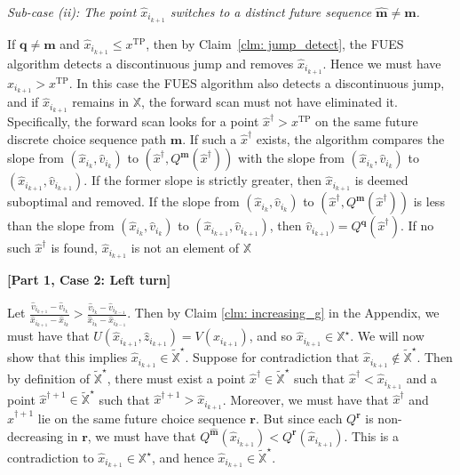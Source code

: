 \documentclass[12pt]{article}
\newcommand{\mVecVar}{\mathbf{m}}
\newcommand{\qVecVar}{\mathbf{q}}
\newcommand{\rVecVar}{\mathbf{r}}
\begin{document}
\textit{Sub-case (ii): The point $\hat{x}_{i_{k+1}}$ switches to a distinct future sequence $\hat{\mVecVar}\neq \mVecVar$.}

If $\qVecVar\neq \mVecVar$ and $\hat{x}_{i_{k+1}}\leq x^{\text{TP}}$, then by Claim~\ref{clm: jump_detect}, the FUES algorithm detects a discontinuous jump and removes $\hat{x}_{i_{k+1}}$.  Hence we must have $\hat{x}_{i_{k+1}} > x^{\text{TP}}$.  In this case the FUES algorithm also detects a discontinuous jump, and if $\hat{x}_{i_{k+1}}$ remains in $\mathbb{X}$, the forward scan must not have eliminated it.  Specifically, the forward scan looks for a point $\hat{x}^{\dagger} > x^{\text{TP}}$ on the same future discrete choice sequence path $\mVecVar$.  
If such a $\hat{x}^{\dagger}$ exists, the algorithm compares the slope from $(\hat{x}_{i_{k}},\hat{v}_{i_{k}})$ to $(\hat{x}^{\dagger},Q^{\mVecVar}(\hat{x}^{\dagger}))$ with the slope from $(\hat{x}_{i_{k}},\hat{v}_{i_{k}})$ to $(\hat{x}_{i_{k+1}},\hat{v}_{i_{k+1}})$. If the former slope is strictly greater, then $\hat{x}_{i_{k+1}}$ is deemed suboptimal and removed. If the slope from $(\hat{x}_{i_{k}},\hat{v}_{i_{k}})$ to $(\hat{x}^{\dagger},Q^{\mVecVar}(\hat{x}^{\dagger}))$ is less than the slope from $(\hat{x}_{i_{k}},\hat{v}_{i_{k}})$ to $(\hat{x}_{i_{k+1}},\hat{v}_{i_{k+1}})$, then $\hat{v}_{i_{k+1}})= Q^{\qVecVar}(\hat{x}^{\dagger})$. If no such $\hat{x}^{\dagger}$ is found, $\hat{x}_{i_{k+1}}$ is not an element of $\mathbb{X}$


\textbf{[Part 1, Case 2: Left turn]}

Let $\frac{\hat{v}_{i_{k+1}} - \hat{v}_{i_{k}}}{\hat{x}_{i_{k+1}}-\hat{x}_{i_k}} > \frac{\hat{v}_{i_k} - \hat{v}_{i_{k-1}}}{\hat{x}_{i_k}-\hat{x}_{i_{k-1}}}$. Then by Claim \ref{clm: increasing_g} in the Appendix, we must have that $U(\hat{x}_{i_{k+1}},\hat{z}_{i_{k+1}}) = V(\hat{x}_{i_{k+1}})$, and so $\hat{x}_{i_{k+1}}\in \mathbb{X}^{\star}$. We will now show that this implies $\hat{x}_{i_{k+1}}\in \widetilde{\mathbb{X}}^{\star}$. Suppose for contradiction that $\hat{x}_{i_{k+1}}\not \in \widetilde{\mathbb{X}}^{\star}$. Then by definition of $\widetilde{\mathbb{X}}^{\star}$, there must exist a point $\hat{x}^{\dagger} \in \widetilde{\mathbb{X}}^{\star}$ such that $\hat{x}^{\dagger} < \hat{x}_{i_{k+1}}$ and a point $\hat{x}^{\dagger +1} \in \widetilde{\mathbb{X}}^{\star}$ such that $\hat{x}^{\dagger +1} > \hat{x}_{i_{k+1}}$. Moreover, we must have that $\hat{x}^{\dagger}$ and $\hat{x}^{\dagger +1}$ lie on the same future choice sequence $\rVecVar$. But since each $Q^{\rVecVar}$ is non-decreasing in $\rVecVar$, we must have that $Q^{\hat{\mVecVar}}(\hat{x}_{i_{k+1}}) < Q^{\rVecVar}(\hat{x}_{i_{k+1}})$. This is a contradiction to $\hat{x}_{i_{k+1}}\in \mathbb{X}^{\star}$, and hence $\hat{x}_{i_{k+1}}\in \widetilde{\mathbb{X}}^{\star}$.
\end{document}
